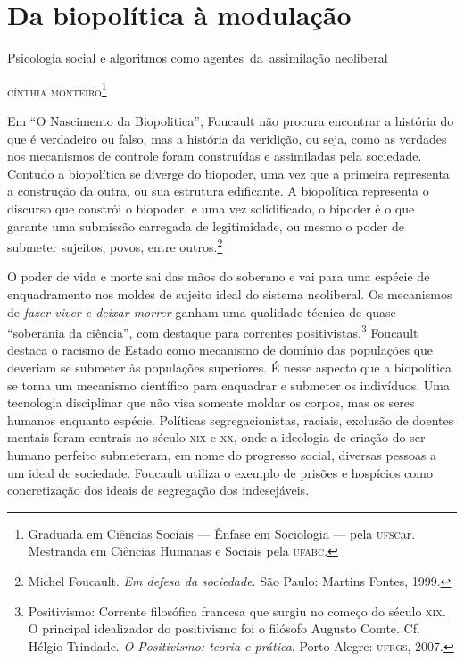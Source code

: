 \chapter{Da biopolítica à modulação}{Psicologia social e algoritmos como agentes~da~assimilação neoliberal}{}


\begin{flushright}
\textsc{cínthia monteiro\footnote{Graduada em Ciências Sociais --- Ênfase em Sociologia --- pela \textsc{ufsc}ar. Mestranda em Ciências Humanas e Sociais pela \textsc{ufabc}.}}
\end{flushright}

\noindent{}Em ``O Nascimento da Biopolitica'', Foucault não procura
encontrar a história do que é verdadeiro ou falso, mas a história da
veridição, ou seja, como as verdades nos mecanismos de controle foram
construídas e assimiladas pela sociedade. Contudo a biopolítica se
diverge do biopoder, uma vez que a primeira representa a construção da
outra, ou sua estrutura edificante. A biopolítica representa o discurso
que constrói o biopoder, e uma vez solidificado, o bipoder é o que
garante uma submissão carregada de legitimidade, ou mesmo o poder de
submeter sujeitos, povos, entre outros.\footnote{Michel Foucault. \emph{Em defesa da sociedade}. São Paulo: Martins Fontes, 1999.}

O poder de vida e morte sai das mãos do soberano e vai para uma espécie
de enquadramento nos moldes de sujeito ideal do sistema neoliberal. Os
mecanismos de \emph{fazer viver e deixar morrer} ganham uma qualidade
técnica de quase ``soberania da ciência'', com destaque para correntes
positivistas.\footnote{Positivismo: Corrente filosófica francesa que
  surgiu no começo do século \textsc{xix}. O principal idealizador do positivismo
  foi o filósofo Augusto Comte. Cf. Hélgio Trindade. \emph{O Positivismo: teoria e prática}. Porto Alegre: \textsc{ufrgs}, 2007.} Foucault destaca o
racismo de Estado como mecanismo de domínio das populações que deveriam
se submeter às populações superiores. É nesse aspecto que a biopolítica
se torna um mecanismo científico para enquadrar e submeter os
indivíduos. Uma tecnologia disciplinar que não visa somente moldar os
corpos, mas os seres humanos enquanto espécie. Políticas
segregacionistas, raciais, exclusão de doentes mentais foram centrais no
século \textsc{xix} e \textsc{xx}, onde a ideologia de criação do ser humano perfeito
submeteram, em nome do progresso social, diversas pessoas a um
ideal de sociedade. Foucault utiliza o exemplo de prisões e hospícios
como concretização dos ideais de segregação dos indesejáveis.

